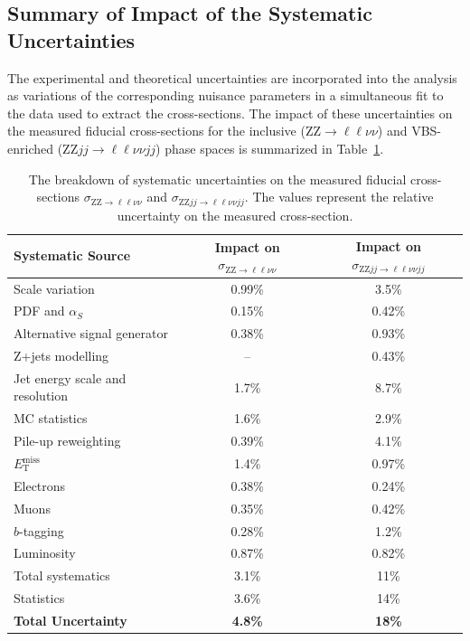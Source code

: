 \subsection{Summary of Impact of the Systematic Uncertainties}

The experimental and theoretical uncertainties are incorporated into the analysis as variations of the corresponding nuisance parameters in a simultaneous fit to the data used to extract the cross-sections. The impact of these uncertainties on the measured fiducial cross-sections for the inclusive ($\text{ZZ} \to \ell\ell\nu\nu$) and VBS-enriched ($\text{ZZ}jj \to \ell\ell\nu\nu jj$) phase spaces is summarized in Table~\ref{tab:uncertainties}.

\begin{table}[htbp]
\centering
\renewcommand{\arraystretch}{1.5}
\begin{tabular}{lcc}
\toprule
\textbf{Systematic Source} & \textbf{Impact on $\sigma_{\text{ZZ} \to \ell\ell\nu\nu}$} & \textbf{Impact on $\sigma_{\text{ZZ}jj \to \ell\ell\nu\nu jj}$} \\
\midrule
Scale variation                          & 0.99\%  & 3.5\%   \\
PDF and $\alpha_S$          & 0.15\%  & 0.42\%  \\
Alternative signal generator & 0.38\%  & 0.93\%  \\
$\text{Z}$+jets modelling             & --      & 0.43\%  \\
\midrule
Jet energy scale and resolution & 1.7\%   & 8.7\%   \\
MC statistics                & 1.6\%   & 2.9\%   \\
Pile-up reweighting        & 0.39\%  & 4.1\%   \\
$E_{\text{T}}^{\text{miss}}$  & 1.4\%   & 0.97\%  \\
Electrons     & 0.38\%  & 0.24\%  \\
Muons         & 0.35\%  & 0.42\%  \\
$b$-tagging                 & 0.28\%  & 1.2\%   \\
\midrule
Luminosity                  & 0.87\%  & 0.82\%  \\
\midrule
Total systematics             & 3.1\%   & 11\%   \\
\midrule
Statistics             & 3.6\%   & 14\%   \\
\midrule
\textbf{Total Uncertainty}            &  \textbf{4.8\%}  &  \textbf{18\%}   \\
\bottomrule
\end{tabular}
\caption{The breakdown of systematic uncertainties on the measured fiducial cross-sections $\sigma_{\text{ZZ} \to \ell\ell\nu\nu}$ and $\sigma_{\text{ZZ}jj \to \ell\ell\nu\nu jj}$. The values represent the relative uncertainty on the measured cross-section.}
\label{tab:uncertainties}
\end{table}

